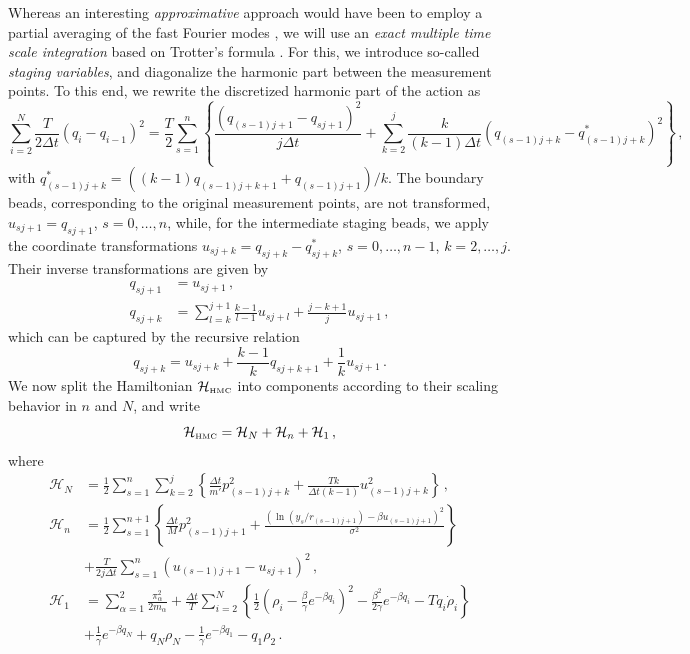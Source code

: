 \documentclass[11pt]{article}
\theoremstyle{definition}
\begin{document}
Whereas an interesting {\em approximative} approach would have been to employ a partial averaging of the fast Fourier modes \cite{doll_1985_fourier}, we will use an {\em exact multiple time scale integration} based on Trotter's formula \cite{tuckerman_1993}. For this, we introduce so-called {\it staging variables}, and diagonalize the harmonic part between the measurement points. To this end, we rewrite the discretized harmonic part of the action as
\begin{equation}
  \sum_{i=2}^{N}
  \frac{T}{2\Delta t}
  (q_i-q_{i-1})^2
  =
  \frac{T}{2}
  \sum_{s=1}^{n}\left\{
    \frac{(q_{(s-1)j+1} - q_{sj+1})^2}{j\Delta t}
    +
    \sum_{k=2}^j
    \frac{k}{(k-1)\Delta t}
    (q_{(s-1)j+k}-q^*_{(s-1)j+k})^2
  \right\}\,,
\end{equation}
with $  q^*_{(s-1)j+k}  =  ((k-1)q_{(s-1)j+k+1} + q_{(s-1)j+1} )/k$.
The boundary beads, corresponding to the original measurement points, are not transformed,
$  u_{sj+1} = q_{sj+1}$, $s=0,\dots,n$,
while, for the intermediate staging beads, we apply the coordinate transformations
$u_{sj+k} = q_{sj+k} - q^*_{sj+k}$, $s=0,\dots,n-1$, $k=2,\dots,j$.
Their inverse transformations are given by
\begin{align}
  q_{sj+1} &= u_{sj+1}\,,
  \\
  q_{sj+k} &= \sum_{l=k}^{j+1}\frac{k-1}{l-1}u_{sj+l}
  +\frac{j-k+1}{j}u_{sj+1}\,,
\end{align}
which can be captured by the recursive relation
\begin{equation}
  q_{sj+k} = u_{sj+k} + \frac{k-1}{k} q_{sj+k+1}+ \frac{1}{k}u_{sj+1} \,.
\end{equation}
We now split the Hamiltonian $\mathcal{H}_{\mbox{\tiny HMC}}$ into components according to their scaling behavior in $n$ and $N$, and write
\begin{equation}
  \mathcal{H}_{\mbox{\tiny HMC}}= \mathcal H_N+\mathcal H_n+\mathcal H_1\,,
\end{equation}
where
\begin{align}
  \mathcal H_N &=
  \frac{1}{2}
  \sum_{s=1}^{n}
  \sum_{k=2}^j
  \left\{
    \frac{\Delta t}{m'}p_{(s-1)j+k}^2
    +
    \frac{Tk}{\Delta t(k-1)}
    u_{(s-1)j+k}^2
  \right\}\,,\label{H_N}
  \\\label{H_n}
  \mathcal H_n &=
  \frac{1}{2}
  \sum_{s=1}^{n+1}
  \left\{
   \frac{\Delta t }{M}p_{(s-1)j+1}^2
    +
    \frac{(\ln(y_s/r_{(s-1)j+1}) - {\beta u_{(s-1)j+1}})^2}{\sigma^2}
   \right\}
   \\\nonumber
  &+
  \frac{T}{2j\Delta t}
  \sum_{s=1}^{n}
    (u_{(s-1)j+1} - u_{sj+1})^2
   \,,
  \\ \label{H_1}
  \mathcal H_1 &=
   \sum_{\alpha=1}^2\frac{\pi_\alpha^2}{2m_\alpha}
   +
  \frac{\Delta t}{T}
   \sum_{i=2}^{N}
   \left\{
    \frac{1}{2}
     \left(
        \rho_i-\frac{\beta}{\gamma}e^{-\beta q_i}
     \right)^2
    -
    \frac{\beta^2}{2\gamma}
    e^{-\beta q_i}
   -
    T q_i\dot\rho_i
   \right\}
  \\\nonumber
  &+
  \frac{1}{\gamma}
  e^{-\beta q_N}
  +
  q_N \rho_{N}
  -
  \frac{1}{\gamma}
  e^{-\beta q_1}
  -
  q_1 \rho_{2} \,.
\end{align}
\end{document}
